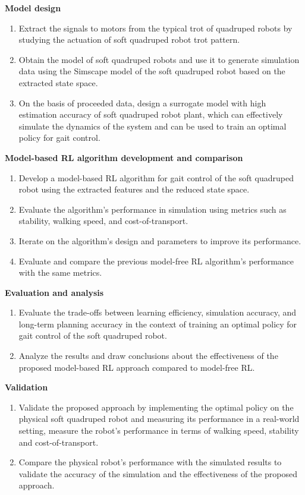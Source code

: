 \textbf{Model design}
\begin{enumerate}
    \item Extract the signals to motors from the typical trot of quadruped robots by studying the actuation of soft quadruped robot trot pattern.
    \item Obtain the model of soft quadruped robots and use it to generate simulation data using the Simscape model of the soft quadruped robot based on the extracted state space. 
    \item On the basis of proceeded data, design a surrogate model with high estimation accuracy of soft quadruped robot plant, which can effectively simulate the dynamics of the system and can be used to train an optimal policy for gait control. 
\end{enumerate}
\textbf{Model-based \ac{RL} algorithm development and comparison}
\begin{enumerate}
    \item Develop a model-based \ac{RL} algorithm for gait control of the soft quadruped robot using the extracted features and the reduced state space.
    \item Evaluate the algorithm's performance in simulation using metrics such as stability, walking speed, and cost-of-transport.
    \item Iterate on the algorithm's design and parameters to improve its performance.
    \item Evaluate and compare the previous model-free \ac{RL} algorithm's performance with the same metrics.
\end{enumerate}
\textbf{Evaluation and analysis}
\begin{enumerate}
    \item Evaluate the trade-offs between learning efficiency, simulation accuracy, and long-term planning accuracy in the context of training an optimal policy for gait control of the soft quadruped robot.
    \item Analyze the results and draw conclusions about the effectiveness of the proposed model-based \ac{RL} approach compared to model-free \ac{RL}.
\end{enumerate}
\textbf{Validation}
\begin{enumerate}
    \item Validate the proposed approach by implementing the optimal policy on the physical soft quadruped robot and measuring its performance in a real-world setting, measure the robot's performance in terms of walking speed, stability and cost-of-transport.
    \item Compare the physical robot's performance with the simulated results to validate the accuracy of the simulation and the effectiveness of the proposed approach.
\end{enumerate}

